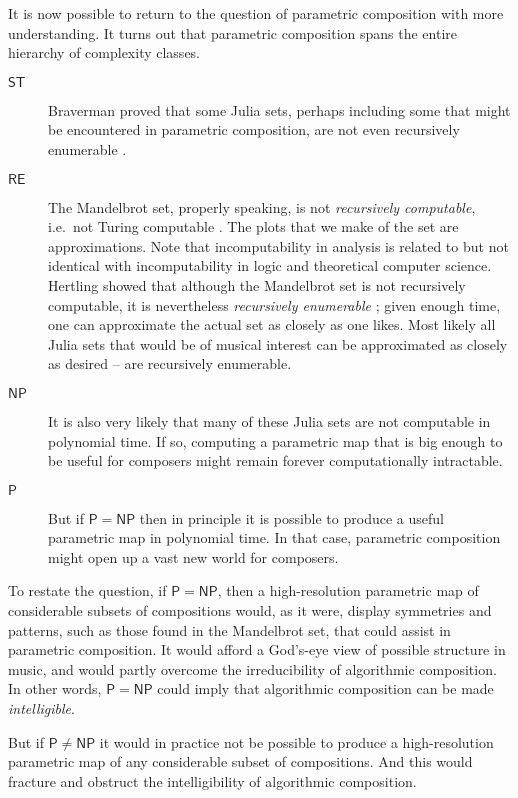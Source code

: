 \documentclass[11pt]{scrartcl}
\begin{document}
It is now possible to return to the question of parametric composition with more understanding. It turns out that parametric composition spans the entire hierarchy of complexity classes.

\begin{description}
\item[$\mathsf{ST}$]  Braverman proved that some Julia sets, perhaps including some that might be encountered in parametric composition, are not even recursively enumerable \parencite{braverman2006non, braverman2009computability}.
\item[$\mathsf{RE}$] The Mandelbrot set, properly speaking, is not \emph{recursively computable}, i.e.\ not Turing computable \parencite{blum1993godel}. The plots that we make of the set are approximations. Note that incomputability in analysis is related to but not identical with incomputability in logic and theoretical computer science. Hertling showed that although the  Mandelbrot set is not recursively computable, it is nevertheless \emph{recursively enumerable} \parencite{Hertling2005-HERITM-3}; given enough time, one can approximate the actual set as closely as one likes. Most likely all Julia sets that would be of musical interest can be approximated as closely as desired -- are recursively enumerable.
\item[$\mathsf{NP}$] It is also very likely that many of these Julia sets are not computable in polynomial time. If so, computing a parametric map that is big enough to be useful for composers might remain forever computationally intractable.
\item[$\mathsf{P}$] But if $\mathsf{P} = \mathsf{NP}$ then in principle it is possible to produce a useful parametric map in polynomial time. In that case, parametric composition might open up a vast new world for composers.
\end{description}

To restate the question, if $\mathsf{P} = \mathsf{NP}$, then a high-resolution parametric map of considerable subsets of compositions would, as it were, display symmetries and patterns, such as those found in the Mandelbrot set, that could assist in parametric composition. It would afford a God's-eye view of possible structure in music, and would partly overcome the irreducibility of algorithmic composition. In other words, $\mathsf{P} = \mathsf{NP}$ could imply that algorithmic composition can be made \emph{intelligible}.

But if $\mathsf{P} \ne \mathsf{NP}$ it would in practice not be possible to produce a high-resolution parametric map of any considerable subset of compositions. And this would fracture and obstruct the intelligibility of algorithmic composition.
\end{document}
